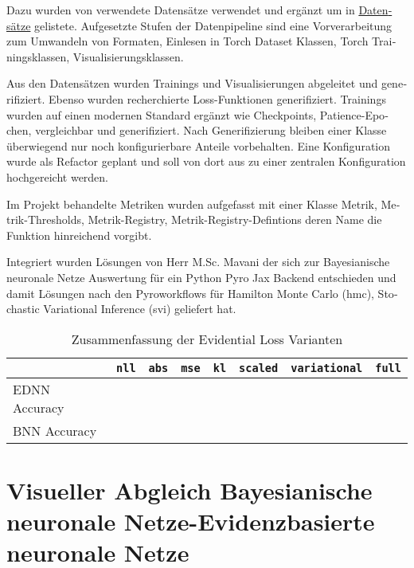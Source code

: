 \begin{otherlanguage}{ngerman}
Dazu wurden von \parencite{Depeweg2019} verwendete Datensätze verwendet und ergänzt um in \hyperref[sec:datensaetze]{Datensätze} gelistete. Aufgesetzte Stufen der Datenpipeline sind eine Vorverarbeitung zum Umwandeln von Formaten, Einlesen in Torch Dataset Klassen, Torch Trainingsklassen, Visualisierungsklassen.\newline

Aus den Datensätzen wurden Trainings und Visualisierungen abgeleitet und generifiziert. Ebenso wurden recherchierte Loss-Funktionen generifiziert. Trainings wurden auf einen modernen Standard ergänzt wie Checkpoints, Patience-Epochen, vergleichbar und generifiziert. Nach Generifizierung bleiben einer Klasse überwiegend nur noch konfigurierbare Anteile vorbehalten. Eine Konfiguration wurde als Refactor geplant und soll von dort aus zu einer zentralen Konfiguration hochgereicht werden.\newline

Im Projekt behandelte Metriken wurden aufgefasst mit einer Klasse Metrik, Metrik-Thresholds, Metrik-Registry, Metrik-Registry-Defintions deren Name die Funktion hinreichend vorgibt.\newline

Integriert wurden Lösungen von Herr M.Sc. Mavani der sich zur \gls{Bayesianische neuronale Netze} Auswertung für ein Python Pyro Jax Backend entschieden und damit Lösungen nach den Pyroworkflows für Hamilton Monte Carlo (\gls{hmc}), Stochastic Variational Inference (\gls{svi}) geliefert hat.



\begin{table}[htbp]
\centering
\begin{tabularx}{\textwidth}{|l|l|l|l|l|l|l|X|}
\hline
 & \texttt{nll} & \texttt{abs} & \texttt{mse} & \texttt{kl} & \texttt{scaled} & \texttt{variational} & \texttt{full} \\
\hline
EDNN Accuracy & & & & & & & \\
\hline
BNN Accuracy & & & & & & & \\
\hline
\end{tabularx}
\caption{Zusammenfassung der Evidential Loss Varianten}
\end{table}


\section*{Visueller Abgleich \gls{Bayesianische neuronale Netze}-\gls{Evidenzbasierte neuronale Netze}}


\end{otherlanguage}
